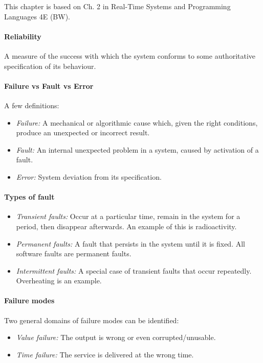 
This chapter is based on Ch. 2 in Real-Time Systems and Programming Languages 4E (BW).

\sepline

\paragraph{Reliability} A measure of the success with which the system conforms to some authoritative specification of its behaviour.

\paragraph{Failure vs Fault vs Error} A few definitions:
\begin{itemize}
  \item \textit{Failure:} A mechanical or algorithmic cause which, given the right conditions, produce an unexpected or incorrect result.
  \item \textit{Fault:} An internal unexpected problem in a system, caused by activation of a fault.
  \item \textit{Error:} System deviation from its specification.
\end{itemize}



\paragraph{Types of fault}
\begin{itemize}[nolistsep,noitemsep]
  \item \textit{Transient faults:} Occur at a particular time, remain in the system for a period, then disappear afterwards. An example of this is radioactivity.
  \item \textit{Permanent faults:} A fault that persists in the system until it is fixed. All software faults are permanent faults.
  \item \textit{Intermittent faults:} A special case of transient faults that occur repeatedly. Overheating is an example.
\end{itemize}

\paragraph{Failure modes} Two general domains of failure modes can be identified:
\begin{itemize}[nolistsep,noitemsep]
  \item \textit{Value failure:} The output is wrong or even corrupted/unusable.
  \item \textit{Time failure:} The service is delivered at the wrong time.
\end{itemize}

